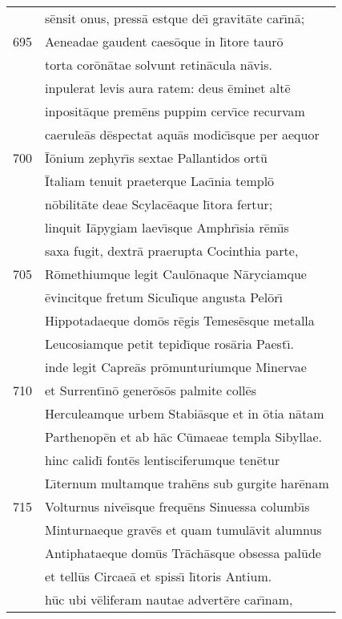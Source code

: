 \documentclass[paper=6in:9in,pagesize=pdftex,
               headinclude=on,footinclude=on,12pt]{scrbook}
\begin{document}
\begin{longtable}[p]{ r l }
 & s\=ensit onus, press\=a estque de\={\i} gravit\=ate car\={\i}n\=a;\\ 
695 & Aeneadae gaudent caes\=oque in l\={\i}tore taur\=o\\ 
 & torta cor\=on\=atae solvunt retin\=acula n\=avis.\\ 
 & inpulerat levis aura ratem: deus \=eminet alt\=e\\ 
 & inposit\=aque prem\=ens puppim cerv\={\i}ce recurvam\\ 
 & caerule\=as d\=espectat aqu\=as modic\={\i}sque per aequor\\ 
700 & \=I\=onium zephyr\={\i}s sextae Pallantidos ort\=u\\ 
 & \=Italiam tenuit praeterque Lac\={\i}nia templ\=o\\ 
 & n\=obilit\=ate deae Scylac\=eaque l\={\i}tora fertur;\\ 
 & linquit I\=apygiam laev\={\i}sque Amphr\={\i}sia r\=em\={\i}s\\ 
 & saxa fugit, dextr\=a praerupta Cocinthia parte,\\ 
705 & R\=omethiumque legit Caul\=onaque N\=aryciamque\\ 
 & \=evincitque fretum Sicul\={\i}que angusta Pel\=or\={\i}\\ 
 & Hippotadaeque dom\=os r\=egis Temes\=esque metalla\\ 
 & Leucosiamque petit tepid\={\i}que ros\=aria Paest\={\i}.\\ 
 & inde legit Capre\=as pr\=omunturiumque Minervae\\ 
710 & et Surrent\={\i}n\=o gener\=os\=os palmite coll\=es\\ 
 & Herculeamque urbem Stabi\=asque et in \=otia n\=atam\\ 
 & Parthenop\=en et ab h\=ac C\=umaeae templa Sibyllae.\\ 
 & hinc calid\={\i} font\=es lentisciferumque ten\=etur\\ 
 & L\={\i}ternum multamque trah\=ens sub gurgite har\=enam\\ 
715 & Volturnus nive\={\i}sque frequ\=ens Sinuessa columb\={\i}s\\ 
 & Minturnaeque grav\=es et quam tumul\=avit alumnus\\ 
 & Antiphataeque dom\=us Tr\=ach\=asque obsessa pal\=ude\\ 
 & et tell\=us Circae\=a et spiss\={\i} l\={\i}toris Antium.\\ 
 & h\=uc ubi v\=eliferam nautae advert\=ere car\={\i}nam,\\ 

\end{longtable}
\end{document}
